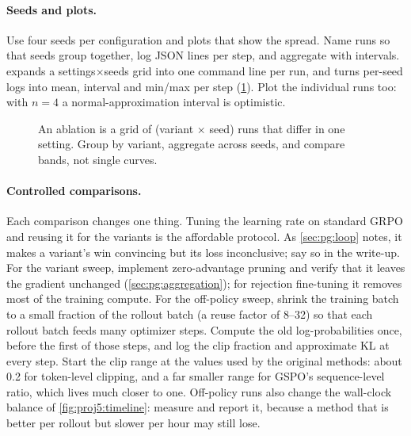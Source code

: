 \paragraph{Seeds and plots.} Use four seeds per configuration and plots that show the spread. Name
runs so that seeds group together, log JSON lines per step, and aggregate with intervals.
 expands a settings$\times$seeds grid into one command line per run, and
 turns per-seed logs into mean, interval and min/max per step
(\cref{fig:proj5:matrix}). Plot the individual runs too: with $n=4$ a normal-approximation interval is
optimistic.

\begin{figure}[t]
\centering
{}
\caption{An ablation is a grid of (variant $\times$ seed) runs that differ in one setting. Group by
variant, aggregate across seeds, and compare bands, not single curves.}
\label{fig:proj5:matrix}
\end{figure}

\paragraph{Controlled comparisons.} Each comparison changes one thing. Tuning the learning rate on
standard GRPO and reusing it for the variants is the affordable protocol. As \cref{sec:pg:loop} notes,
it makes a variant's win convincing but its loss inconclusive; say so in the write-up. For the
variant sweep, implement zero-advantage pruning and verify that it leaves the gradient unchanged
(\cref{sec:pg:aggregation}); for rejection fine-tuning it removes most of the training compute. For the
off-policy sweep, shrink the training batch to a small fraction of the rollout batch (a reuse factor
of 8--32) so that each rollout batch feeds many optimizer steps. Compute the old log-probabilities
once, before the first of those steps, and log the clip fraction and approximate KL at every step.
Start the clip range at the values used by the original methods: about 0.2 for token-level
clipping, and a far smaller range for GSPO's sequence-level ratio, which lives much closer to one.
Off-policy runs also change the wall-clock balance of \cref{fig:proj5:timeline}: measure and report it,
because a method that is better per rollout but slower per hour may still lose.

